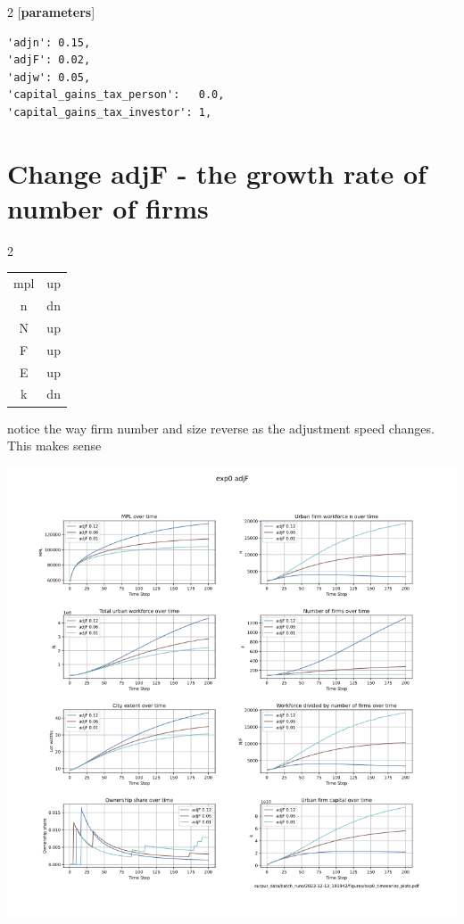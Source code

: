 \documentclass{article}
\begin{document}
\begin{multicols}{2}
[\textbf{parameters}]
\begin{verbatim}
'adjn': 0.15,
'adjF': 0.02,
'adjw': 0.05, 
'capital_gains_tax_person':   0.0,
'capital_gains_tax_investor': 1,
\end{verbatim}

\end{multicols}
\newpage
\section{Change adjF - the growth rate of number of firms }

\begin{multicols}{2}
\begin{tabular}{c|c}
  mpl   &  up\\
  n   &  dn\\
  N   &  up\\
  F   & up \\
  E   &  up\\
  k   & dn
\end{tabular}

  notice the way firm number and size reverse as the adjustment speed changes. This makes sense
  
\end{multicols}

\includegraphics[scale=.55]{fig/Analysis/AdjF.png}
\end{document}
